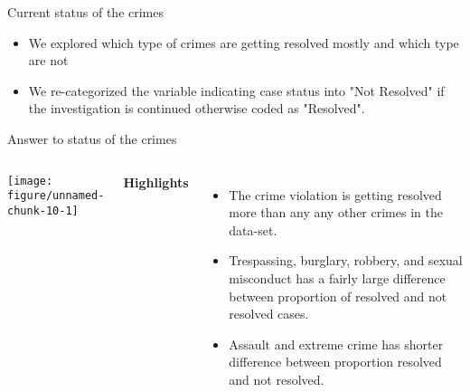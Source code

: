 \documentclass{beamer}\usepackage[]{graphicx}\usepackage[]{xcolor}
\makeatletter
\def\maxwidth{ %
  \ifdim\Gin@nat@width>\linewidth
    \linewidth
  \else
    \Gin@nat@width
  \fi
}
\newenvironment{knitrout}{}{} %
\makeatother
\begin{document}
\begin{frame}[fragile]{Current status of the crimes}


\begin{itemize}
\item We explored which type of crimes are getting resolved mostly and which type are not

\item We re-categorized the variable indicating case status into "Not Resolved" if the investigation is continued otherwise coded as "Resolved".
\end{itemize}
\end{frame}



\begin{frame}[fragile]{Answer to status of the crimes}
\begin{columns}
\begin{knitrout}
\color{fgcolor}
\texttt{[image: figure/unnamed-chunk-10-1]} 
\end{knitrout}

\textbf{Highlights}
\begin{itemize}
\item The crime violation is getting resolved more than any any other crimes in the data-set.
\item Trespassing, burglary, robbery, and sexual misconduct has a fairly large difference between proportion of resolved and not resolved cases. 
\item Assault and extreme crime has shorter difference between proportion resolved and not resolved.

\end{itemize}

\end{columns}
\end{frame} 
\end{document}
